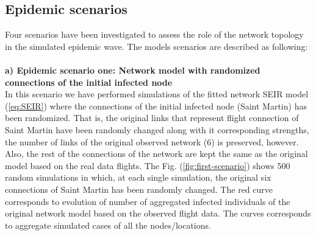 \documentclass[10pt,a4paper]{article}
\begin{document}
\subsection*{Epidemic scenarios}
Four scenarios have been investigated to assess the role of the network topology in the simulated epidemic wave. The models scenarios are described as following:
\\\\
%
\textbf{a) Epidemic scenario one: Network model with randomized connections of the initial infected node}\\
In this scenario we have performed simulations of the fitted network SEIR model (\ref{eq:SEIR}) where the connections of the initial infected node (Saint Martin) has been randomized. 
%
That is, the original links that represent flight connection of Saint Martin have been randomly changed along with it corresponding strengths, the number of links of the original observed network (6) is preserved, however. 
%
Also, the rest of the connections of the network are kept the same as the original model based on the real data flights. 
%
The Fig. (\ref{fig:first-scenario}) shows 500 random simulations in which, at each single simulation, the original six connections of Saint Martin has been randomly changed. The red curve corresponds to evolution of number of aggregated infected individuals of the original network model based on the observed flight data. The curves corresponds to aggregate simulated cases of all the nodes/locations. 
%
\\\\
\end{document}
